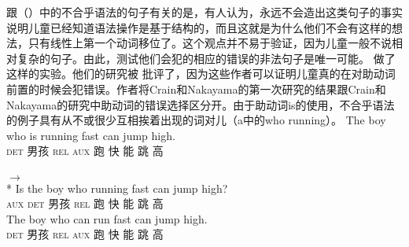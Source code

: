 跟（）中的不合乎语法的句子有关的是，有人认为，永远不会造出这类句子的事实说明儿童已经知道语法操作是基于结构的，而且这就是为什么他们不会有这样的想法，只有线性上第一个动词移位了\citep{CN87a-u}。这个观点并不易于验证，因为儿童一般不说相对复杂的句子。由此，测试他们会犯的相应的错误的非法句子是唯一可能。 \citet{CN87a-u}做了这样的实验。他们的研究被 \citet*{ARP2008a}批评了，因为这些作者可以证明儿童真的在对助动词前置的时候会犯错误。作者将Crain和Nakayama的第一次研究的结果跟Crain和Nakayama的研究中助动词的错误选择区分开。由于助动词is的使用，不合乎语法的例子具有从不或很少互相挨着出现的词对儿（a中的who running）。
\eal
\ex 
\gll  {} The boy who is running fast can jump high. \\
      {}              \textsc{det} 男孩 \textsc{rel} \textsc{aux} 跑 快 能 跳 高\\
\glt {}\\
$\to$\\
 {}* \gll Is the boy who running fast can jump high?\\
          \textsc{aux} \textsc{det} 男孩 \textsc{rel} 跑 快 能 跳 高\\
\ex 
\gll {} The boy who can run fast can jump high. \\
     {}              \textsc{det} 男孩 \textsc{rel} \textsc{aux} 跑 快 能 跳 高\\
